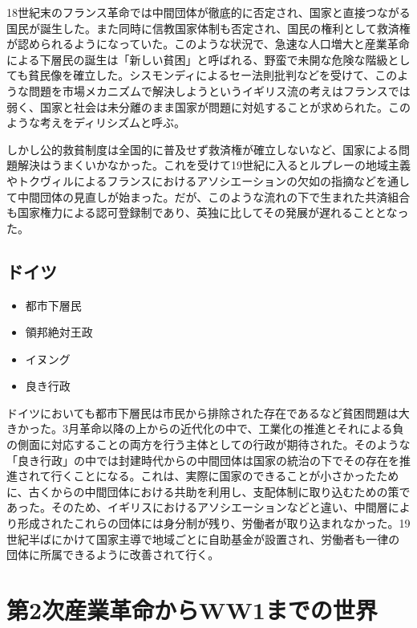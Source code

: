 \documentclass{jsarticle}
\begin{document}
18世紀末のフランス革命では中間団体が徹底的に否定され、国家と直接つながる国民が誕生した。また同時に信教国家体制も否定され、国民の権利として救済権が認められるようになっていた。このような状況で、急速な人口増大と産業革命による下層民の誕生は「新しい貧困」と呼ばれる、野蛮で未開な危険な階級としても貧民像を確立した。シスモンディによるセー法則批判などを受けて、このような問題を市場メカニズムで解決しようというイギリス流の考えはフランスでは弱く、国家と社会は未分離のまま国家が問題に対処することが求められた。このような考えをディリシズムと呼ぶ。

しかし公的救貧制度は全国的に普及せず救済権が確立しないなど、国家による問題解決はうまくいかなかった。これを受けて19世紀に入るとルプレーの地域主義やトクヴィルによるフランスにおけるアソシエーションの欠如の指摘などを通して中間団体の見直しが始まった。だが、このような流れの下で生まれた共済組合も国家権力による認可登録制であり、英独に比してその発展が遅れることとなった。

\subsection{ドイツ}
\begin{itemize}
	\item 都市下層民
	\item 領邦絶対王政
	\item イヌング
	\item 良き行政
\end{itemize}

ドイツにおいても都市下層民は市民から排除された存在であるなど貧困問題は大きかった。3月革命以降の上からの近代化の中で、工業化の推進とそれによる負の側面に対応することの両方を行う主体としての行政が期待された。そのような「良き行政」の中では封建時代からの中間団体は国家の統治の下でその存在を推進されて行くことになる。これは、実際に国家のできることが小さかったために、古くからの中間団体における共助を利用し、支配体制に取り込むための策であった。そのため、イギリスにおけるアソシエーションなどと違い、中間層により形成されたこれらの団体には身分制が残り、労働者が取り込まれなかった。19世紀半ばにかけて国家主導で地域ごとに自助基金が設置され、労働者も一律の団体に所属できるように改善されて行く。


\section{第2次産業革命からWW1までの世界}
\end{document}
